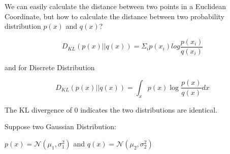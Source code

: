 We can easily calculate the distance between two points in a Euclidean Coordinate, 
but how to calculate the distance between two probability distribution $p(x)$ and $q(x)$?

$$D_{KL}(p(x)||q(x))=\Sigma_i{p(x_i)log\frac{p(x_i)}{q(x_i)}}$$ 

and for Discrete Distribution

$$D_{KL}(p(x)||q(x))=\int_x p(x)\log{\frac{p(x)}{q(x)}}dx$$

The KL divergence of 0 indicates the two distributions are identical.

Suppose two Gaussian Distribution:

$p(x)=\mathcal{N}(\mu_1,\sigma_1^2)$ and $q(x)=\mathcal{N}(\mu_2,\sigma_2^2)$


